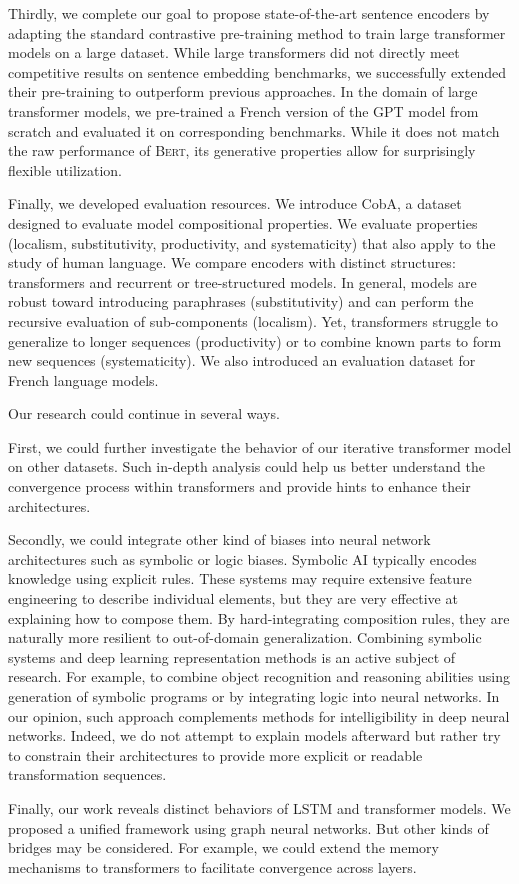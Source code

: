 Thirdly, we complete our goal to propose state-of-the-art sentence encoders by adapting the standard contrastive pre-training method to train large transformer models on a large dataset. While large transformers did not directly meet competitive results on sentence embedding benchmarks, we successfully extended their pre-training to outperform previous approaches. In the domain of large transformer models, we pre-trained a French version of the GPT model from scratch and evaluated it on corresponding benchmarks. While it does not match the raw performance of \textsc{Bert}, its generative properties allow for surprisingly flexible utilization.

Finally, we developed evaluation resources. We introduce CobA, a dataset designed to evaluate model compositional properties. We evaluate properties (localism, substitutivity, productivity, and systematicity) that also apply to the study of human language. We compare encoders with distinct structures: transformers and recurrent or tree-structured models. In general, models are robust toward introducing paraphrases (substitutivity) and can perform the recursive evaluation of sub-components (localism). Yet, transformers struggle to generalize to longer sequences (productivity) or to combine known parts to form new sequences (systematicity). We also introduced an evaluation dataset for French language models.

Our research could continue in several ways. 

First, we could further investigate the behavior of our iterative transformer model on other datasets. Such in-depth analysis could help us better understand the convergence process within transformers and provide hints to enhance their architectures. 

Secondly, we could integrate other kind of biases into neural network architectures such as symbolic or logic biases. Symbolic AI typically encodes knowledge using explicit rules. These systems may require extensive feature engineering to describe individual elements, but they are very effective at explaining how to compose them. By hard-integrating composition rules, they are naturally more resilient to out-of-domain generalization. Combining symbolic systems and deep learning representation methods is an active subject of research. For example, to combine object recognition and reasoning abilities using generation of symbolic programs or by integrating logic into neural networks. In our opinion, such approach complements methods for intelligibility in deep neural networks. Indeed, we do not attempt to explain models afterward but rather try to constrain their architectures to provide more explicit or readable transformation sequences. 

Finally, our work reveals distinct behaviors of LSTM and transformer models. We proposed a unified framework using graph neural networks. But other kinds of bridges may be considered. For example, we could extend the memory mechanisms to transformers to facilitate convergence across layers.

